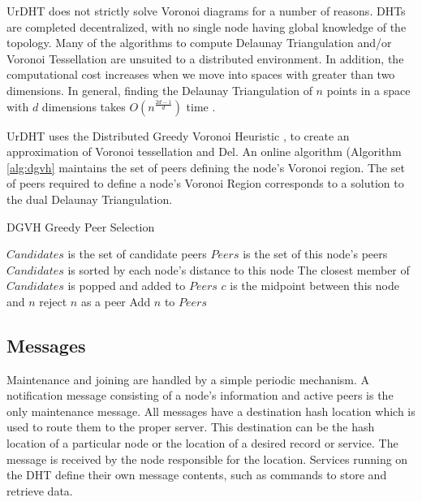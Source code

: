 \documentclass[11pt]{IEEEtran} %
\begin{document}
UrDHT does not strictly solve Voronoi diagrams \cite{voronoi} for a number of reasons. 
DHTs are completed decentralized, with no single node having global knowledge of the topology.
Many of the algorithms to compute Delaunay Triangulation and/or Voronoi Tessellation are unsuited to a distributed environment.
In addition, the computational cost increases when we move into spaces with greater than two dimensions.
In general, finding the Delaunay Triangulation of $n$ points in a space with $d$ dimensions takes $O(n^{\frac{2d-1}{d}})$ time \cite{watson1981computing}.
 
UrDHT uses the Distributed Greedy Voronoi Heuristic \cite{dgvh}, to create an approximation of Voronoi tessellation and Del. 
An online algorithm (Algorithm \ref{alg:dgvh} maintains the set of peers defining the node's Voronoi region. The set of peers required to define a node's Voronoi Region corresponds to a solution to the dual Delaunay Triangulation.



\begin{algorithm}
\caption{DGVH Greedy Peer Selection}
\label{alg:dgvh}
\begin{algorithmic}[1]  %
	\STATE $Candidates$ is the set of candidate peers
    \STATE $Peers$ is the set of this node's peers
    \STATE $Candidates$ is sorted by each node's distance to this node
    \STATE The closest member of $Candidates$ is popped and added to $Peers$
    	\STATE $c$ is the midpoint between this node and $n$
        	\STATE reject $n$ as a peer
        \ELSE
        	\STATE Add $n$ to $Peers$
        \ENDIF
    \ENDFOR
\end{algorithmic}
\end{algorithm}


\subsection{Messages}
Maintenance and joining are handled by a simple periodic mechanism. A notification message consisting of a node's information and active peers is the only maintenance message. All messages have a destination hash location which is used to route them to the proper server. This destination can be the hash location of a particular node or the location of a desired record or service.  The message is received by the node responsible for the location. Services running on the DHT define their own message contents, such as commands to store and retrieve data.
\end{document}
